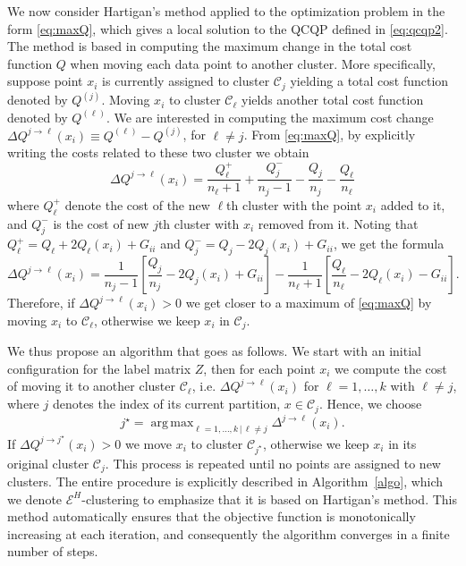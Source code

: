 \documentclass[aps,preprint,nofootinbib,floatfix]{revtex4-1}
\DeclareMathOperator*{\argmax}{arg\,max}
\newcommand\C{{\mathcal{C}}}
\begin{document}
We now consider Hartigan's method \cite{Hartigan} 
applied to the optimization problem in the form \eqref{eq:maxQ}, which gives
a local solution to the QCQP defined in \eqref{eq:qcqp2}. 
The method is based in computing the maximum change
in the total cost function $Q$ when moving each data point to
another cluster. More specifically, 
suppose point $x_i$
is currently assigned to  cluster $\C_j$ yielding
a total cost function denoted by $Q^{(j)}$.
Moving $x_i$ to cluster $\C_\ell$ yields another total cost function
denoted by $Q^{(\ell)}$. We are interested in computing the maximum 
cost change
$\Delta Q^{j\to \ell} (x_i) \equiv Q^{(\ell)} - Q^{(j)}$, for $\ell\ne j$. 
From \eqref{eq:maxQ}, by explicitly writing the costs related to these 
two cluster we obtain
\begin{equation}
\Delta Q^{j\to \ell} (x_i) = \dfrac{Q_\ell^{+}}{n_\ell+1} + 
\dfrac{Q_j^-}{n_j-1} - \dfrac{Q_j}{n_j} - \dfrac{Q_\ell}{n_\ell}
\end{equation}
where $Q^{+}_\ell$ denote the cost of the new $\ell$th cluster
with the point $x_i$ added to it, and $Q^-_j$ is the cost of new 
$j$th cluster with $x_i$ removed from it. Noting that 
$Q_\ell^{+} = Q_\ell + 2 Q_\ell(x_i) + G_{ii}$ and
$Q_j^{-} = Q_j - 2 Q_j(x_i) + G_{ii}$, we get the formula
\begin{equation}
\label{eq:changeQ}
\Delta Q^{j \to \ell}(x_i)  = 
\dfrac{1}{n_j - 1}\left[ \dfrac{Q_j}{n_j} - 2 Q_j(x_i) + G_{ii} \right]
- \dfrac{1}{n_\ell + 1}\left[ \dfrac{Q_\ell}{n_\ell} - 2 Q_\ell(x_i) 
- G_{ii} \right].
\end{equation}
Therefore, if $\Delta Q^{j\to \ell}(x_i) > 0$ we get closer to a 
maximum of \eqref{eq:maxQ} by
moving $x_i$ to $\C_\ell$, otherwise we keep $x_i$ in $\C_j$. 

We thus propose an algorithm that goes as follows.
We start with an initial configuration for the label matrix $Z$, 
then for each
point $x_i$ 
we compute the cost of moving it to another cluster $\C_\ell$, i.e.
$\Delta Q^{j\to \ell}(x_i)$ for 
$\ell=1,\dots,k$ with $\ell \ne j$, where $j$ denotes the index of its current
partition, $x \in \C_j$. Hence, we choose
\begin{equation}
j^\star = \argmax_{\ell=1,\dotsc,k \, | \, \ell\ne j} 
\Delta^{j \to \ell}(x_i).
\end{equation}
If $\Delta Q^{j \to j^\star}(x_i) > 0$ 
we move $x_i$ to cluster $\C_{j^\star}$, otherwise 
we keep $x_i$ in its original cluster $\C_j$. 
This process is repeated
until no points are assigned to new clusters. 
The entire procedure is explicitly described in Algorithm~\ref{algo}, which we
denote $\mathcal{E}^H$-clustering to emphasize that it is based on
Hartigan's method.
This method automatically ensures that the objective function is
monotonically increasing at each iteration, and consequently the algorithm
converges in a finite number of steps.
\end{document}
